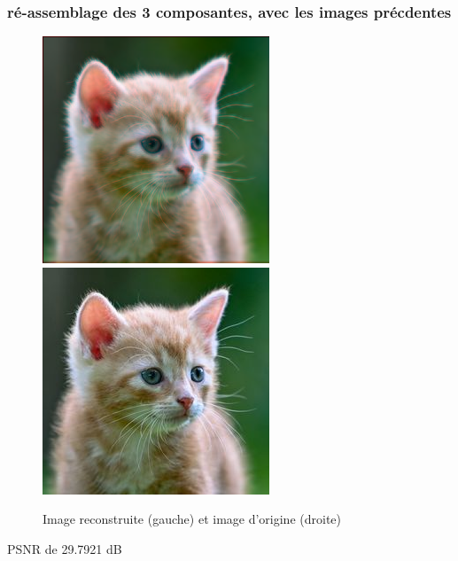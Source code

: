 \documentclass{article}
\begin{document}
\subsubsection*{ré-assemblage des 3 composantes, avec les images précdentes}
\begin{figure}[h]
\centerline{\includegraphics[scale=0.9]{./rendus/ChalexRGReduit.png} \includegraphics[scale=0.9]{./rendus/Chalex.png} }
\caption{Image reconstruite (gauche) et image d'origine (droite) }
\end{figure}

PSNR de 29.7921 dB


\newpage
\end{document}
